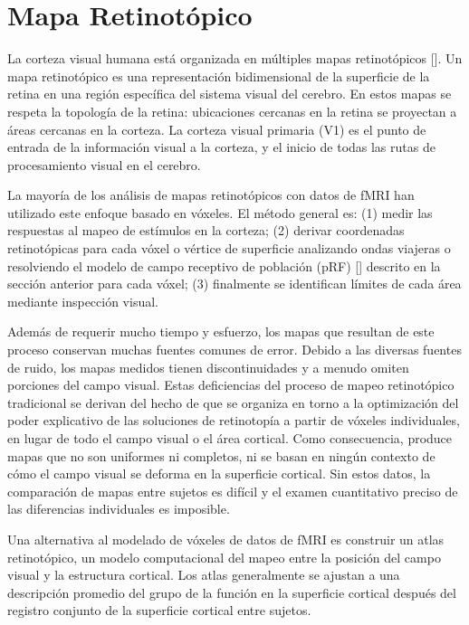 \section{Mapa Retinotópico}

La corteza visual humana está organizada en múltiples mapas retinotópicos [\cite{wandell_computational_2015}]. Un mapa retinotópico es una representación bidimensional de la superficie de la retina en una región específica del sistema visual del cerebro. En estos mapas se respeta la topología de la retina: ubicaciones cercanas en la retina se proyectan a áreas cercanas en la corteza. La corteza visual primaria (V1) es el punto de entrada de la información visual a la corteza, y el inicio de todas las rutas de procesamiento visual en el cerebro. 

La mayoría de los análisis de mapas retinotópicos con datos de fMRI han utilizado este enfoque basado en vóxeles. El método general es: (1) medir las respuestas al mapeo de estímulos en la corteza; (2) derivar coordenadas retinotópicas para cada vóxel o vértice de superficie analizando ondas viajeras o resolviendo el modelo de campo receptivo de población (pRF) [\cite{dumoulin_population_2008}] descrito en la sección anterior para cada vóxel; (3) finalmente se identifican límites de cada área mediante inspección visual.

Además de requerir mucho tiempo y esfuerzo, los mapas que resultan de este proceso conservan muchas fuentes comunes de error. Debido a las diversas fuentes de ruido, los mapas medidos tienen discontinuidades y a menudo omiten porciones del campo visual. Estas deficiencias del proceso de mapeo retinotópico tradicional se derivan del hecho de que se organiza en torno a la optimización del poder explicativo de las soluciones de retinotopía a partir de vóxeles individuales, en lugar de todo el campo visual o el área cortical. Como consecuencia, produce mapas que no son uniformes ni completos, ni se basan en ningún contexto de cómo el campo visual se deforma en la superficie cortical. Sin estos datos, la comparación de mapas entre sujetos es difícil y el examen cuantitativo preciso de las diferencias individuales es imposible.

Una alternativa al modelado de vóxeles de datos de fMRI es construir un atlas retinotópico, un modelo computacional del mapeo entre la posición del campo visual y la estructura cortical. Los atlas generalmente se ajustan a una descripción promedio del grupo de la función en la superficie cortical después del registro conjunto de la superficie cortical entre sujetos.


